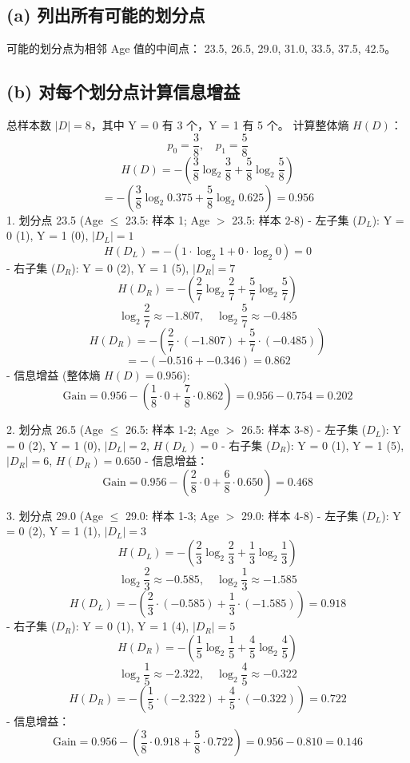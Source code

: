 \documentclass{article}
\begin{document}
\subsection*{(a) 列出所有可能的划分点}
可能的划分点为相邻 Age 值的中间点： 23.5, 26.5, 29.0, 31.0, 33.5, 37.5, 42.5。

\subsection*{(b) 对每个划分点计算信息增益}
总样本数 $|D| = 8$，其中 Y = 0 有 3 个，Y = 1 有 5 个。  
计算整体熵 $H(D)$：
\[
p_0 = \frac{3}{8}, \quad p_1 = \frac{5}{8}
\]
\[
H(D) = - \left( \frac{3}{8} \log_2 \frac{3}{8} + \frac{5}{8} \log_2 \frac{5}{8} \right)
\]
\[
= - \left( \frac{3}{8} \log_2 0.375 + \frac{5}{8} \log_2 0.625 \right)
=0.956\]
1. 划分点 23.5 (Age $\leq$ 23.5: 样本 1; Age $>$ 23.5: 样本 2-8)
- 左子集 ($D_L$): Y = 0 (1), Y = 1 (0), $|D_L| = 1$
  \[
  H(D_L) = - \left( 1 \cdot \log_2 1 + 0 \cdot \log_2 0 \right) = 0
  \]
- 右子集 ($D_R$): Y = 0 (2), Y = 1 (5), $|D_R| = 7$
  \[
  H(D_R) = - \left( \frac{2}{7} \log_2 \frac{2}{7} + \frac{5}{7} \log_2 \frac{5}{7} \right)
  \]
  \[
  \log_2 \frac{2}{7} \approx -1.807, \quad \log_2 \frac{5}{7} \approx -0.485
  \]
  \[
  H(D_R) = - \left( \frac{2}{7} \cdot (-1.807) + \frac{5}{7} \cdot (-0.485) \right)
  \]
  \[
  = - \left( -0.516 + -0.346 \right) = 0.862
  \]
- 信息增益 (整体熵 $H(D) = 0.956$):
  \[
  \text{Gain} = 0.956 - \left( \frac{1}{8} \cdot 0 + \frac{7}{8} \cdot 0.862 \right) = 0.956 - 0.754 = 0.202
  \]

2. 划分点 26.5 (Age $\leq$ 26.5: 样本 1-2; Age $>$ 26.5: 样本 3-8)
- 左子集 ($D_L$): Y = 0 (2), Y = 1 (0), $|D_L| = 2$, $H(D_L) = 0$
- 右子集 ($D_R$): Y = 0 (1), Y = 1 (5), $|D_R| = 6$, $H(D_R) = 0.650$
- 信息增益：
  \[
  \text{Gain} = 0.956 - \left( \frac{2}{8} \cdot 0 + \frac{6}{8} \cdot 0.650 \right) = 0.468
  \]

3. 划分点 29.0 (Age $\leq$ 29.0: 样本 1-3; Age $>$ 29.0: 样本 4-8)
- 左子集 ($D_L$): Y = 0 (2), Y = 1 (1), $|D_L| = 3$
  \[
  H(D_L) = - \left( \frac{2}{3} \log_2 \frac{2}{3} + \frac{1}{3} \log_2 \frac{1}{3} \right)
  \]
  \[
  \log_2 \frac{2}{3} \approx -0.585, \quad \log_2 \frac{1}{3} \approx -1.585
  \]
  \[
  H(D_L) = - \left( \frac{2}{3} \cdot (-0.585) + \frac{1}{3} \cdot (-1.585) \right) = 0.918
  \]
- 右子集 ($D_R$): Y = 0 (1), Y = 1 (4), $|D_R| = 5$
  \[
  H(D_R) = - \left( \frac{1}{5} \log_2 \frac{1}{5} + \frac{4}{5} \log_2 \frac{4}{5} \right)
  \]
  \[
  \log_2 \frac{1}{5} \approx -2.322, \quad \log_2 \frac{4}{5} \approx -0.322
  \]
  \[
  H(D_R) = - \left( \frac{1}{5} \cdot (-2.322) + \frac{4}{5} \cdot (-0.322) \right) = 0.722
  \]
- 信息增益：
  \[
  \text{Gain} = 0.956 - \left( \frac{3}{8} \cdot 0.918 + \frac{5}{8} \cdot 0.722 \right) = 0.956 - 0.810 = 0.146
  \]
\end{document}
